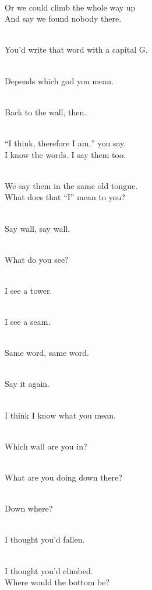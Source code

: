 \begin{lyrics}
\\
Or we could climb the whole way up\\
And say we found nobody there.

\\
You’d write that word with a capital G.

\\
Depends which god you mean.

\\
Back to the wall, then.

\\
“I think, therefore I am,” you say.\\
I know the words. I say them too.

\\
We say them in the same old tongue.\\
What does that “I” mean to you?

\\
Say wall, say wall.

\\
What do you see?

\\
I see a tower.

\\
I see a seam.

\\
Same word, same word.

\\
Say it again.

\\
I think I know what you mean.

\\
Which wall are you in?


\\
What are you doing down there?

\\
Down where?

\\
I thought you’d fallen.

\\
I thought you’d climbed.\\
Where would the bottom be?


\end{lyrics}
